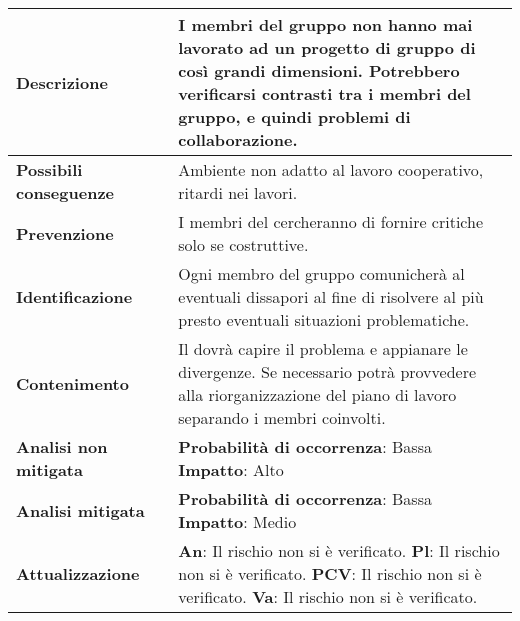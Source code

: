 	\small
	\begin{table}[H]
		\begin{center}			
			\begin{tabular}{p{2.5cm}p{0.5cm}p{11cm}}
				\arrayrulecolor{lightgray}
				
				\toprule				
				\textbf{Descrizione}
				& &
				I membri del gruppo non hanno mai lavorato ad un progetto di gruppo di così grandi dimensioni. Potrebbero verificarsi contrasti tra i membri del gruppo, e quindi problemi di collaborazione.
				\\
				\midrule
				\textbf{Possibili \newline conseguenze}
				& &
				Ambiente non adatto al lavoro cooperativo, ritardi nei lavori.
				\\
				\midrule
				\textbf{Prevenzione}
				& &
				I membri del \glo{Gruppo}{team} cercheranno di fornire critiche solo se costruttive.
				\\
				\midrule
				\textbf{Identificazione}
				& &
				Ogni membro del gruppo comunicherà al \responsabilediprogetto{} eventuali dissapori al fine di risolvere al più presto eventuali situazioni problematiche.
				\\
				\midrule
				\textbf{Contenimento}
				& &
				Il \responsabilediprogetto{} dovrà capire il problema e appianare le divergenze. Se necessario potrà provvedere alla riorganizzazione del piano di lavoro separando i membri coinvolti.
				\\
				\midrule
				\textbf{Analisi \newline non mitigata}
				& &
				\textbf{Probabilità di occorrenza}: Bassa
				\newline
				\textbf{Impatto}: Alto
				\\
				\midrule
				\textbf{Analisi \newline mitigata}
				& &
				\textbf{Probabilità di occorrenza}: Bassa
				\newline
				\textbf{Impatto}: Medio
				\\
				\midrule
				\textbf{Attualizzazione}
				& &
				\textbf{An}: Il rischio non si è verificato.
				\newline
				\textbf{Pl}: Il rischio non si è verificato.
				\newline
				\textbf{PCV}: Il rischio non si è verificato.
				\newline
				\textbf{Va}: Il rischio non si è verificato.
				\\
				
				\bottomrule	
			\end{tabular}
		\end{center}
	\end{table}			
	
